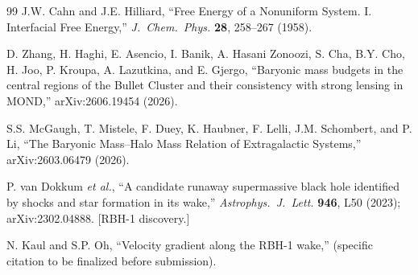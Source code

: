 \documentclass[aps,prd,twocolumn,superscriptaddress,amsmath,amssymb,nofootinbib,floatfix]{revtex4-2}
\begin{document}
\begin{thebibliography}{99}
J.W. Cahn and J.E. Hilliard,
``Free Energy of a Nonuniform System. I. Interfacial Free Energy,''
\emph{J.\ Chem.\ Phys.} \textbf{28}, 258--267 (1958).

D. Zhang, H. Haghi, E. Asencio, I. Banik, A. Hasani Zonoozi, S. Cha, B.Y. Cho, H. Joo, P. Kroupa, A. Lazutkina, and E. Gjergo,
``Baryonic mass budgets in the central regions of the Bullet Cluster and their consistency with strong lensing in MOND,''
arXiv:2606.19454 (2026).

S.S. McGaugh, T. Mistele, F. Duey, K. Haubner, F. Lelli, J.M. Schombert, and P. Li,
``The Baryonic Mass--Halo Mass Relation of Extragalactic Systems,''
arXiv:2603.06479 (2026).

P. van Dokkum \emph{et al.},
``A candidate runaway supermassive black hole identified by shocks and star formation in its wake,''
\emph{Astrophys.\ J.\ Lett.} \textbf{946}, L50 (2023); arXiv:2302.04888. [RBH-1 discovery.]

N. Kaul and S.P. Oh,
``Velocity gradient along the RBH-1 wake,''
(specific citation to be finalized before submission).

\end{thebibliography}
\end{document}
